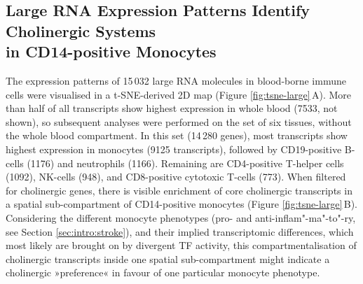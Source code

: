 \subsection{Large RNA Expression Patterns Identify Cholinergic Systems\\ in CD14-positive Monocytes}
The expression patterns of 15\,032 large RNA molecules in blood-borne immune cells were visualised in a t-SNE-derived 2D map (Figure \ref{fig:tsne-large}\,A). More than half of all transcripts show highest expression in whole blood (7533, not shown), so subsequent analyses were performed on the set of six tissues, without the whole blood compartment. In this set (14\,280 genes), most transcripts show highest expression in monocytes (9125 transcripts), followed by CD19-positive B-cells (1176) and neutrophils (1166). Remaining are CD4-positive T-helper cells (1092), NK-cells (948), and CD8-positive cytotoxic T-cells (773). When filtered for cholinergic genes, there is visible enrichment of core cholinergic transcripts in a spatial sub-compartment of CD14-positive monocytes (Figure \ref{fig:tsne-large}\,B). Considering the different monocyte phenotypes (pro- and anti-inflam"-ma"-to"-ry, see Section \ref{sec:intro:stroke}), and their implied transcriptomic differences, which most likely are brought on by divergent TF activity, this compartmentalisation of cholinergic transcripts inside one spatial sub-compartment might indicate a cholinergic »preference« in favour of one particular monocyte phenotype. 

